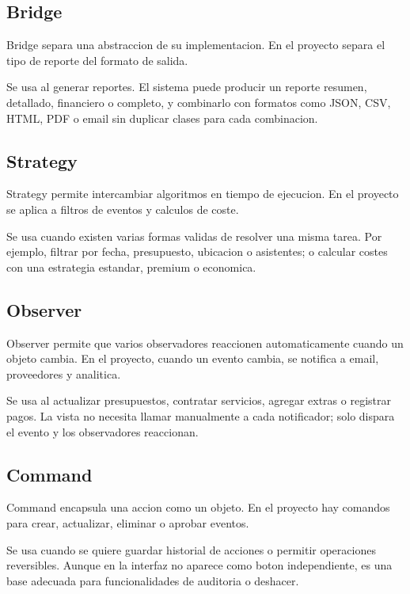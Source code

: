 \documentclass[12pt,a4paper]{article}
\begin{document}
\subsection{Bridge}

Bridge separa una abstraccion de su implementacion. En el proyecto separa el tipo de reporte del formato de salida.

Se usa al generar reportes. El sistema puede producir un reporte resumen, detallado, financiero o completo, y combinarlo con formatos como JSON, CSV, HTML, PDF o email sin duplicar clases para cada combinacion.

\subsection{Strategy}

Strategy permite intercambiar algoritmos en tiempo de ejecucion. En el proyecto se aplica a filtros de eventos y calculos de coste.

Se usa cuando existen varias formas validas de resolver una misma tarea. Por ejemplo, filtrar por fecha, presupuesto, ubicacion o asistentes; o calcular costes con una estrategia estandar, premium o economica.

\subsection{Observer}

Observer permite que varios observadores reaccionen automaticamente cuando un objeto cambia. En el proyecto, cuando un evento cambia, se notifica a email, proveedores y analitica.

Se usa al actualizar presupuestos, contratar servicios, agregar extras o registrar pagos. La vista no necesita llamar manualmente a cada notificador; solo dispara el evento y los observadores reaccionan.

\subsection{Command}

Command encapsula una accion como un objeto. En el proyecto hay comandos para crear, actualizar, eliminar o aprobar eventos.

Se usa cuando se quiere guardar historial de acciones o permitir operaciones reversibles. Aunque en la interfaz no aparece como boton independiente, es una base adecuada para funcionalidades de auditoria o deshacer.
\end{document}
